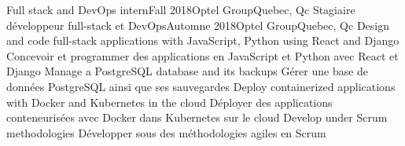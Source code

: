     \resumeSubheadingEnFr
      {Full stack and DevOps intern}{Fall 2018}{Optel Group}{Quebec, Qc}
      {Stagiaire développeur full-stack et DevOps}{Automne 2018}{Optel Group}{Quebec, Qc}
            \resumeItemListStart
                \resumeItemEnFr
                    {Design and code full-stack applications with JavaScript, Python using React and Django}
                    {Concevoir et programmer des applications en JavaScript et Python avec React et Django}
                \resumeItemEnFr
                    {Manage a PostgreSQL database and its backups}
                    {Gérer une base de données PostgreSQL ainsi que ses sauvegardes}
                \resumeItemEnFr
                    {Deploy containerized applications with Docker and Kubernetes in the cloud}
                    {Déployer des applications conteneurisées avec Docker dans Kubernetes sur le cloud}
                \resumeItemEnFr
                    {Develop under Scrum methodologies}
                    {Développer sous des méthodologies agiles en Scrum}
            \resumeItemListEnd
    \resumeSubHeadingListEnd


